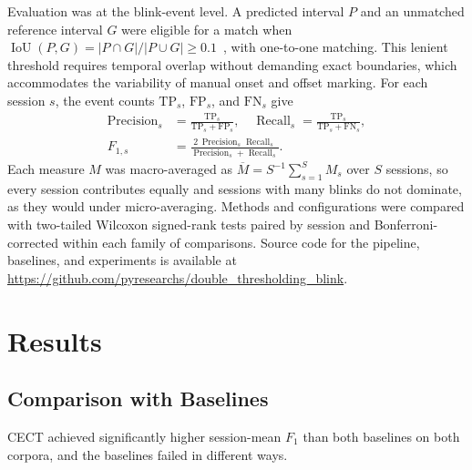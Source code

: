 \documentclass[journal,twoside,web]{ieeecolor}
\begin{document}
Evaluation was at the blink-event level. A predicted interval $P$ and an unmatched reference interval $G$ were eligible for a match when $\operatorname{IoU}(P,G)=|P\cap G|/|P\cup G|\geq 0.1$~\citep{Startsev2023}, with one-to-one matching. This lenient threshold requires temporal overlap without demanding exact boundaries, which accommodates the variability of manual onset and offset marking. For each session $s$, the event counts $\mathrm{TP}_s$, $\mathrm{FP}_s$, and $\mathrm{FN}_s$ give
\begin{align}
\operatorname{Precision}_s&=\frac{\mathrm{TP}_s}{\mathrm{TP}_s+\mathrm{FP}_s},\quad
\operatorname{Recall}_s=\frac{\mathrm{TP}_s}{\mathrm{TP}_s+\mathrm{FN}_s},\\
F_{1,s}&=\frac{2\,\operatorname{Precision}_s\operatorname{Recall}_s}{\operatorname{Precision}_s+\operatorname{Recall}_s}.
\end{align}
Each measure $M$ was macro-averaged as $\overline{M}=S^{-1}\sum_{s=1}^{S}M_s$ over $S$ sessions, so every session contributes equally and sessions with many blinks do not dominate, as they would under micro-averaging. Methods and configurations were compared with two-tailed Wilcoxon signed-rank tests paired by session and Bonferroni-corrected within each family of comparisons. Source code for the pipeline, baselines, and experiments is available at \url{https://github.com/pyresearchs/double_thresholding_blink}.

\section{Results}\label{sec:results}

\subsection{Comparison with Baselines}\label{sec:exp3_strategy}

CECT achieved significantly higher session-mean $F_1$ than both baselines on both corpora, and the baselines failed in different ways.
\end{document}

